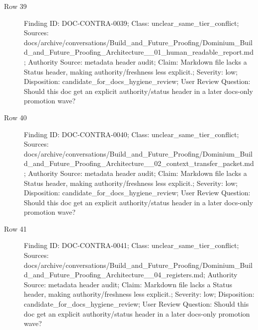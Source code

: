 \documentclass[10.5pt,a4paper,openany]{book}
\begin{document}
\begin{description}
\item[Row 39] Finding ID: DOC-\allowbreak{}CONTRA-\allowbreak{}0039; Class: unclear\_\allowbreak{}same\_\allowbreak{}tier\_\allowbreak{}conflict; Sources: docs/\allowbreak{}archive/\allowbreak{}conversations/\allowbreak{}Build\_\allowbreak{}and\_\allowbreak{}Future\_\allowbreak{}Proofing/\allowbreak{}Dominium\_\allowbreak{}Build\_\allowbreak{}and\_\allowbreak{}Future\_\allowbreak{}Proofing\_\allowbreak{}Architecture\_\allowbreak{}\_\allowbreak{}01\_\allowbreak{}human\_\allowbreak{}readable\_\allowbreak{}report.\allowbreak{}md; Authority Source: metadata header audit; Claim: Markdown file lacks a Status header, making authority/\allowbreak{}freshness less explicit.\allowbreak{}; Severity: low; Disposition: candidate\_\allowbreak{}for\_\allowbreak{}docs\_\allowbreak{}hygiene\_\allowbreak{}review; User Review Question: Should this doc get an explicit authority/\allowbreak{}status header in a later docs-\allowbreak{}only promotion wave?
\item[Row 40] Finding ID: DOC-\allowbreak{}CONTRA-\allowbreak{}0040; Class: unclear\_\allowbreak{}same\_\allowbreak{}tier\_\allowbreak{}conflict; Sources: docs/\allowbreak{}archive/\allowbreak{}conversations/\allowbreak{}Build\_\allowbreak{}and\_\allowbreak{}Future\_\allowbreak{}Proofing/\allowbreak{}Dominium\_\allowbreak{}Build\_\allowbreak{}and\_\allowbreak{}Future\_\allowbreak{}Proofing\_\allowbreak{}Architecture\_\allowbreak{}\_\allowbreak{}02\_\allowbreak{}context\_\allowbreak{}transfer\_\allowbreak{}packet.\allowbreak{}md; Authority Source: metadata header audit; Claim: Markdown file lacks a Status header, making authority/\allowbreak{}freshness less explicit.\allowbreak{}; Severity: low; Disposition: candidate\_\allowbreak{}for\_\allowbreak{}docs\_\allowbreak{}hygiene\_\allowbreak{}review; User Review Question: Should this doc get an explicit authority/\allowbreak{}status header in a later docs-\allowbreak{}only promotion wave?
\item[Row 41] Finding ID: DOC-\allowbreak{}CONTRA-\allowbreak{}0041; Class: unclear\_\allowbreak{}same\_\allowbreak{}tier\_\allowbreak{}conflict; Sources: docs/\allowbreak{}archive/\allowbreak{}conversations/\allowbreak{}Build\_\allowbreak{}and\_\allowbreak{}Future\_\allowbreak{}Proofing/\allowbreak{}Dominium\_\allowbreak{}Build\_\allowbreak{}and\_\allowbreak{}Future\_\allowbreak{}Proofing\_\allowbreak{}Architecture\_\allowbreak{}\_\allowbreak{}04\_\allowbreak{}registers.\allowbreak{}md; Authority Source: metadata header audit; Claim: Markdown file lacks a Status header, making authority/\allowbreak{}freshness less explicit.\allowbreak{}; Severity: low; Disposition: candidate\_\allowbreak{}for\_\allowbreak{}docs\_\allowbreak{}hygiene\_\allowbreak{}review; User Review Question: Should this doc get an explicit authority/\allowbreak{}status header in a later docs-\allowbreak{}only promotion wave?

\end{description}
\end{document}
